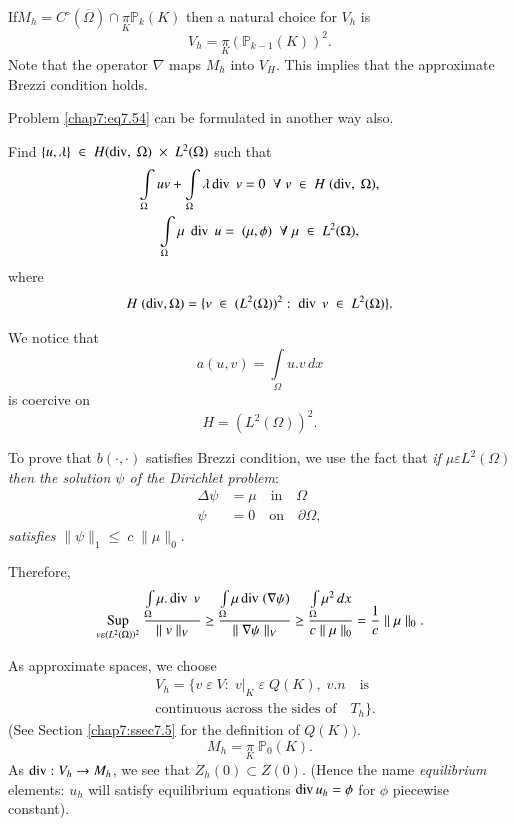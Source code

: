 If\pageoriginale $M_h=C^\circ(\overline{\Omega})\cap\underset{K}{\pi}
\mathbb{P}_k(K)$ then a natural choice for $V_h$ is 
$$
V_h=\underset{K}{\pi}(\mathbb{P}_{k-1}(K))^2.
$$
Note that the operator $\nabla$ maps $M_h$ into $V_H$. This implies
that the approximate Brezzi condition holds.

Problem \eqref{chap7:eq7.54} can be formulated in another way also.

Find $\{u,\lambda\}\;\in \;H(\operatorname{div}, \;\Omega)\;\times
\;L^2(\Omega)$ such that 
\begin{gather*}
\int\limits_\Omega uv+\int\limits_\Omega\lambda\operatorname{div} \;v=0\; \; \forall \;v
\;\in \;H\;(\operatorname{div},\;\Omega),\\
\int\limits_\Omega\mu\;\operatorname{div} \;u=\;(\mu,\phi)\; \; \forall \;\mu
\;\in \;L^2(\Omega),
\end{gather*}
where 
$$
H\;(\operatorname{div},\Omega)=\{v\;\in \;(L^2(\Omega))^2:\;\operatorname{div}
\;v\;\in \;L^2(\Omega)\}.
$$

We notice that 
$$
a(u,v)=\int\limits_\Omega u.v\,dx
$$
is coercive on 
$$
H=(L^2(\Omega))^2.
$$

To prove that $b(\cdotp,\cdotp)$ satisfies Brezzi condition, we use
the fact that \emph{if $\mu\varepsilon L^2(\Omega)$ then the solution
$\psi$ of the Dirichlet problem}:
\begin{align*}
\Delta\psi &= \mu\quad\text{in}\quad\Omega\\
\psi &= 0\quad\text{on}\quad\partial\Omega,
\end{align*}\pageoriginale
\emph{satisfies} $\parallel\psi\parallel_1\leq\;c\;\parallel\mu
\parallel_0$. 

Therefore,
$$
\underset{v\varepsilon(L^2(\Omega))^2}{\operatorname{Sup}}\;
\frac{\int\limits_\Omega\mu.\operatorname{div}\;v}{\parallel v\parallel_V}\geq
\frac{\int\limits_\Omega\mu\operatorname{div}\;(\nabla\psi)}{\parallel\nabla\psi
\parallel_V}\geq\frac{\int\limits_\Omega\mu^2\,dx}{c\parallel\mu
\parallel_0}=\frac{1}{c}\parallel\mu\parallel_0.
$$

As approximate spaces, we choose 
\begin{align*}
&V_h=\{v\;\varepsilon \;V:\;v|_K\;\varepsilon \;Q(K),\;v.n\quad
\text{is}\\
&\text{continuous across the sides of}\quad T_h\}.
\end{align*}
(See Section \ref{chap7:ssec7.5} for the definition of $Q(K))$. 
$$
M_h=\underset{K}{\pi}\;\mathbb{P}_0(K).
$$
As $\operatorname{div} :V_h\to M_h$, we see that $Z_h(0)\subset Z(0)$. (Hence the
name \emph{equilibrium} elements: $u_h$ will satisfy equilibrium
equations $\operatorname{div} u_h=\phi$ for $\phi$ piecewise constant).

